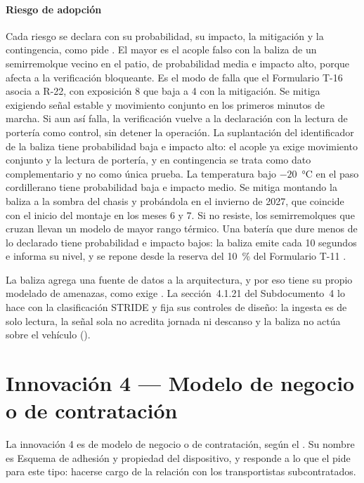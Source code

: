 \paragraph{Riesgo de adopción} Cada riesgo se declara con su probabilidad, su impacto, la mitigación y
la contingencia, como pide . El mayor es el acople falso con la baliza de un
semirremolque vecino en el patio, de probabilidad media e impacto alto, porque afecta a la verificación
bloqueante. Es el modo de falla que el Formulario T-16 asocia a R-22, con exposición 8 que baja a 4 con la
mitigación. Se mitiga exigiendo señal estable y movimiento conjunto en los primeros minutos de marcha.
Si aun así falla, la verificación vuelve a la declaración con la lectura de portería como control, sin
detener la operación. La suplantación del identificador de la baliza tiene probabilidad baja e impacto
alto: el acople ya exige movimiento conjunto y la lectura de portería, y en contingencia se trata como
dato complementario y no como única prueba. La temperatura bajo $-20$~°C en el paso cordillerano tiene
probabilidad baja e impacto medio. Se mitiga montando la baliza a la sombra del chasis y probándola en
el invierno de 2027, que coincide con el inicio del montaje en los meses 6 y 7. Si no resiste, los
semirremolques que cruzan llevan un modelo de mayor rango térmico. Una batería que dure menos de lo
declarado tiene probabilidad e impacto bajos: la baliza emite cada 10 segundos e informa su nivel, y se
repone desde la reserva del 10~\% del Formulario T-11 \parencite{teltonika_eye}.

La baliza agrega una fuente de datos a la arquitectura, y por eso tiene su propio modelado de amenazas,
como exige . La sección~4.1.21 del Subdocumento~4 lo hace con la clasificación
STRIDE y fija sus controles de diseño: la ingesta es de solo lectura, la señal sola no acredita jornada
ni descanso y la baliza no actúa sobre el vehículo ().

\section{Innovación 4 — Modelo de negocio o de contratación}\label{sec:13-innovacion-4}

La innovación 4 es de modelo de negocio o de contratación, según el . Su nombre es
Esquema de adhesión y propiedad del dispositivo, y responde a lo que el  pide
para este tipo: hacerse cargo de la relación con los transportistas subcontratados.

